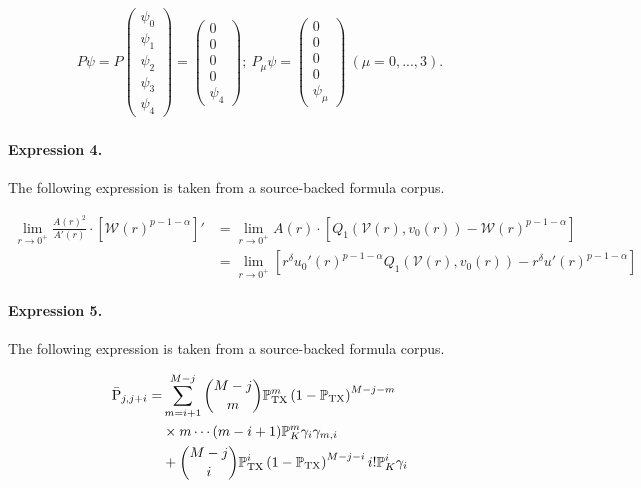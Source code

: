 \documentclass[11pt]{article}
\begin{document}
\begin{align*}P\psi =P\left( \begin{array}{c}\psi _{0} \\ \psi _{1} \\ \psi _{2} \\ \psi _{3} \\ \psi _{4}\end{array}\right) =\left( \begin{array}{c}0 \\ 0 \\ 0 \\ 0 \\ \psi _{4}\end{array}\right) ;\ P_{\mu }\psi =\left( \begin{array}{c}0 \\ 0 \\ 0 \\ 0 \\ \psi _{\mu }\end{array}\right) \ \left( \mu =0,...,3\right) . \end{align*}

\paragraph{Expression 4.} The following expression is taken from a source-backed formula corpus.

\begin{align*}\lim_{r\to 0^+} \frac{A(r)^2}{A'(r)} \cdot \left[\mathcal W(r)^{p-1-\alpha}\right]'&= \lim_{r\to 0^+} A(r) \cdot \left[ Q_1(\mathcal V(r), v_0(r)) - \mathcal W(r)^{p-1-\alpha} \right] \\&= \lim_{r\to 0^+} \left[ r^\delta u_0'(r)^{p-1-\alpha} Q_1(\mathcal V(r), v_0(r)) -r^\delta u'(r)^{p-1-\alpha} \right]\end{align*}

\paragraph{Expression 5.} The following expression is taken from a source-backed formula corpus.

\begin{align*}\bar{\rm P}_{j,j+i} =&\sum^{M-j}_{m=i+1} {M-j \choose m} \mathbb{P}_{\rm TX}^m \left(1- \mathbb{P}_{\rm TX}\right) ^{M-j-m} \\ &\times m \cdots (m-i+1)\mathbb{P}_K^{m} \gamma_i\gamma_{m,i} \\ &+{M-j \choose i} \mathbb{P}_{\rm TX}^i \left(1- \mathbb{P}_{\rm TX}\right) ^{M-j-i} i!\mathbb{P}_K^{i} \gamma_i \end{align*}
\end{document}
